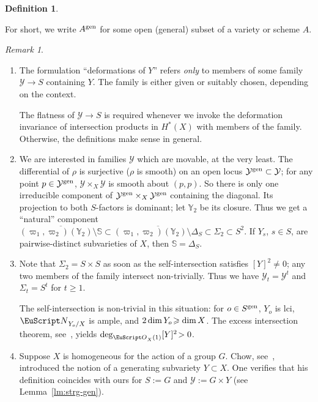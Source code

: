 \documentclass[10pt,a4paper]{article}
\numberwithin{equation}{section}
\theoremstyle{definition}
\newtheorem{m-definition}[m-theorem]{Definition}
\theoremstyle{remark}
\newtheorem{m-remark}[m-theorem]{Remark}
\let\euf\EuScript %
\let\cal\mathcal
\let\mbb\mathbb
\let\ges\geqslant
\let\sm\setminus
\let\vpi\varpi
\renewcommand{\dim}{\mathop{\rm dim}\nolimits}
\newcommand{\gen}{{\rm gen}}
\newcommand{\eN}{{\euf N}}
\newcommand{\eO}{{\euf O}}
\newcommand{\cY}{{\cal Y}}
\newcommand{\XX}{X}
\newcommand{\YY}{Y}
\begin{document}
\begin{m-definition}
\begin{aenum}
\item \label{d:YY-g-e}
  For short, we write $A^\gen$ for some open (general) subset of a variety or scheme $A$.
  \end{aenum}
\end{m-definition}


\begin{m-remark}\label{rmk:G} \leavevmode
  \begin{enumerate}
  \item\label{rmk:G-1} The formulation ``deformations of $\YY$'' refers \emph{only} to members of some family $\cY\to S$ containing $\YY$. The family is either given or suitably chosen, depending on the context. 


The flatness of $\cY\to S$ is required whenever we invoke the deformation invariance of intersection products in $H^*(X)$ with members of the family. Otherwise, the definitions make sense in general. 

\item\label{rmk:G-2} We are interested in families $\cY$ which are movable, at the very least. The differential of $\rho$ is surjective ($\rho$ is smooth) on an open locus $\cY^\gen\subset\cY$; for any point $p\in\cY^\gen$, $\cY\times_\XX\cY$ is smooth about $(p,p)$. So there is only one irreducible component of $\cY^\gen\times_\XX\cY^\gen$ containing the diagonal. Its projection to both $S$-factors is dominant; let $\mbb\YY_2$ be its closure. Thus we get a ``natural''  component $\overline{(\vpi_1,\vpi_2)(\mbb\YY_2)\sm\mbb S}\subset\overline{(\vpi_1,\vpi_2)(\mbb\YY_2)\sm\Delta_S}\subset\Sigma_2\subset S^2$. If $Y_s$, $s\in S$, are pairwise-distinct subvarieties of $\XX$, then $\mbb S=\Delta_S$.

\item\label{rmk:G-3} Note that $\Sigma_2=S\times S$ as soon as the self-intersection satisfies $[Y]^2\neq0$; any two members of the family intersect non-trivially. Thus we have $\cY_t=\cY^t$ and $\Sigma_t=S^t$ for $t\ges1$.

  The self-intersection is non-trivial in this situation: for $o\in S^\gen$, $\YY_o$ is lci, $\eN_{\YY_o/\XX}$ is ample, and  $2\dim\YY_o\!\ges\dim\XX$. The excess intersection theorem, see~\cite{fu-laz}, yields $\deg_{\eO_\XX(1)}[Y]^2\!>0$. 

\item\label{rmk:G-4} Suppose $\XX$ is homogeneous for the action of a group $G$. Chow, see~\cite{chow, dbar-mumford, bad}, introduced the notion of a generating subvariety $\YY\subset\XX$. One verifies that his definition coincides with ours for $S:=G$ and $\cY:=G\times \YY$ (see Lemma~\ref{lm:strg-gen}).
  \end{enumerate}
\end{m-remark}
\end{document}
